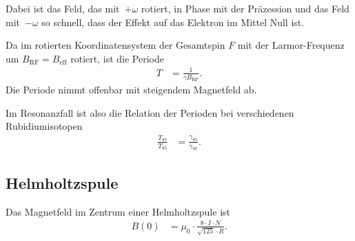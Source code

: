 Dabei ist das Feld, das mit~$+\omega$ rotiert, in Phase mit der
Präzession und das Feld mit~$-\omega$ so schnell, dass der Effekt auf das
Elektron im Mittel Null ist.

Da im rotierten Koordinatensystem der Gesamtspin $F$ mit der Larmor-Frequenz um
$B_\text{RF} = B_\text{eff}$ rotiert, ist die Periode
\begin{align}
  \label{eq:larmor_periode}
  T &= \frac{1}{\gamma B_\text{RF}}.
\end{align}
Die Periode nimmt offenbar mit steigendem Magnetfeld ab.

Im Resonanzfall ist also die Relation der Perioden bei verschiedenen Rubidiumisotopen
\begin{align}
  \label{eq:resonanz_perioden}
  \frac{T_{87}}{T_{85}} &= \frac{\gamma_{85}}{\gamma_{87}}.
\end{align}


\subsection{Helmholtzspule}%
\label{sub:helmholtzspule}
Das Magnetfeld im Zentrum einer Helmholtzspule ist
\begin{align}
  B(0) &= \mu_{0} \cdot \frac{8 \cdot I \cdot N}{\sqrt{125} \cdot R}.
\end{align}
